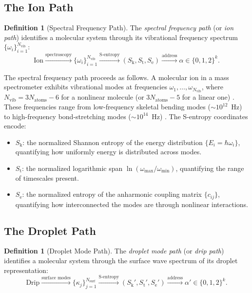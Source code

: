 \documentclass[11pt,twocolumn,a4paper]{article}
\theoremstyle{definition}
\newtheorem{definition}[theorem]{Definition}
\theoremstyle{remark}
\newcommand{\Sk}{S_{\mathrm{k}}}
\newcommand{\St}{S_{\mathrm{t}}}
\newcommand{\Se}{S_{\mathrm{e}}}
\newcommand{\Nvib}{N_{\mathrm{vib}}}
\begin{document}
\subsection{The Ion Path}\label{sec:ion-path}

\begin{definition}[Spectral Frequency Path]\label{def:ion-path}
The \emph{spectral frequency path} (or \emph{ion path}) identifies a molecular system through its vibrational frequency spectrum $\{\omega_i\}_{i=1}^{\Nvib}$:
\begin{equation}\label{eq:ion-path}
  \text{Ion} \xrightarrow{\text{spectroscopy}} \{\omega_i\}_{i=1}^{\Nvib} \xrightarrow{\text{S-entropy}} (\Sk, \St, \Se) \xrightarrow{\text{address}} \alpha \in \{0,1,2\}^k.
\end{equation}
\end{definition}

The spectral frequency path proceeds as follows. A molecular ion in a mass spectrometer exhibits vibrational modes at frequencies $\omega_1, \ldots, \omega_{\Nvib}$, where $\Nvib = 3N_{\mathrm{atoms}} - 6$ for a nonlinear molecule (or $3N_{\mathrm{atoms}} - 5$ for a linear one) \citep{herzberg1945,wilson1955}. These frequencies range from low-frequency skeletal bending modes ($\sim$$10^{12}$~Hz) to high-frequency bond-stretching modes ($\sim$$10^{14}$~Hz) \citep{shimanouchi1972}. The S-entropy coordinates encode:

\begin{itemize}
  \item $\Sk$: the normalized Shannon entropy of the energy distribution $\{E_i = \hbar \omega_i\}$, quantifying how uniformly energy is distributed across modes.
  \item $\St$: the normalized logarithmic span $\ln(\omega_{\max}/\omega_{\min})$, quantifying the range of timescales present.
  \item $\Se$: the normalized entropy of the anharmonic coupling matrix $\{c_{ij}\}$, quantifying how interconnected the modes are through nonlinear interactions.
\end{itemize}

\subsection{The Droplet Path}\label{sec:droplet-path}

\begin{definition}[Droplet Mode Path]\label{def:droplet-path}
The \emph{droplet mode path} (or \emph{drip path}) identifies a molecular system through the surface wave spectrum of its droplet representation:
\begin{equation}\label{eq:droplet-path}
  \text{Drip} \xrightarrow{\text{surface modes}} \{\kappa_j\}_{j=1}^{N_{\mathrm{surf}}} \xrightarrow{\text{S-entropy}} (\Sk', \St', \Se') \xrightarrow{\text{address}} \alpha' \in \{0,1,2\}^k.
\end{equation}
\end{definition}
\end{document}

